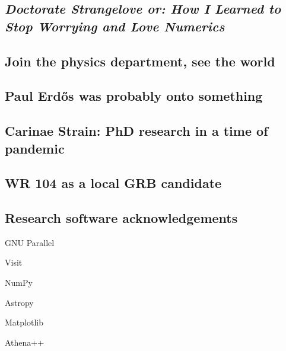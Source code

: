 \subsection[\textit{How I Learned to Stop Worrying and Love Numerics}]{\textit{Doctorate Strangelove or: How I Learned to Stop Worrying and Love Numerics}} 

\subsection{Join the physics department, see the world}

\subsection{Paul Erd\H{o}s was probably onto something}

\subsection{Carinae Strain: PhD research in a time of pandemic}

\subsection{WR 104 as a local GRB candidate}

\subsection{Research software acknowledgements}

GNU Parallel
\textcite{tange_2021_5523272}

Visit 
\textcite{HPV:VisIt}

NumPy
\textcite{harris2020array}

Astropy
\textcite{astropy:2013} \textcite{astropy:2018}

Matplotlib
\textcite{Hunter:2007}

Athena++
\textcite{athena}
